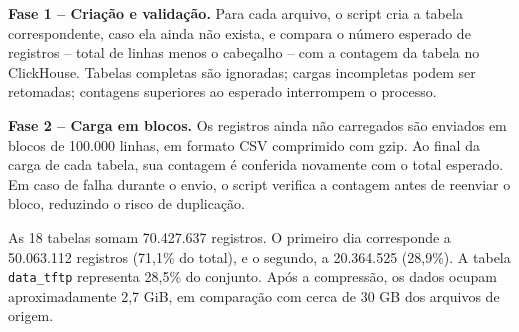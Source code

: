\documentclass[
    12pt,                %
    openright,           %
    oneside,             %
    a4paper,             %
    english,             %
    brazil               %
]{abntex2}
\begin{document}
\textbf{Fase 1 -- Criação e validação.} Para cada arquivo, o script cria a tabela correspondente, caso ela ainda não exista, e compara o número esperado de registros -- total de linhas menos o cabeçalho -- com a contagem da tabela no ClickHouse. Tabelas completas são ignoradas; cargas incompletas podem ser retomadas; contagens superiores ao esperado interrompem o processo.

\textbf{Fase 2 -- Carga em blocos.} Os registros ainda não carregados são enviados em blocos de 100.000 linhas, em formato CSV comprimido com gzip. Ao final da carga de cada tabela, sua contagem é conferida novamente com o total esperado. Em caso de falha durante o envio, o script verifica a contagem antes de reenviar o bloco, reduzindo o risco de duplicação.

As 18 tabelas somam 70.427.637 registros. O primeiro dia corresponde a 50.063.112 registros (71,1\% do total), e o segundo, a 20.364.525 (28,9\%). A tabela \texttt{data\_tftp} representa 28,5\% do conjunto. Após a compressão, os dados ocupam aproximadamente 2,7 GiB, em comparação com cerca de 30 GB dos arquivos de origem.
\end{document}
